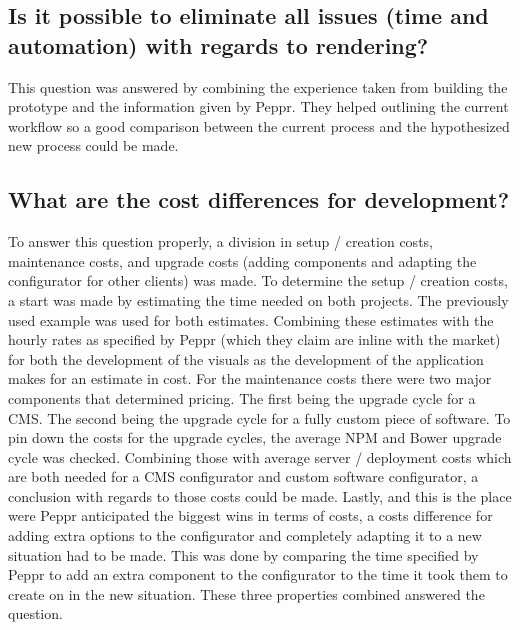 \subsection{Is it possible to eliminate all issues (time and automation) with regards to rendering?}
This question was answered by combining the experience taken from building the prototype and the information given by Peppr. They helped outlining the current workflow so a good comparison between the current process and the hypothesized new process could be made.

\subsection{What are the cost differences for development?}
To answer this question properly, a division in setup / creation costs, maintenance costs, and upgrade costs (adding components and adapting the configurator for other clients) was made. To determine the setup / creation costs, a start was made by estimating the time needed on both projects. The previously used example was used for both estimates. Combining these estimates with the hourly rates as specified by Peppr (which they claim are inline with the market) for both the development of the visuals as the development of the application makes for an estimate in cost.\newline
For the maintenance costs there were two major components that determined pricing. The first being the upgrade cycle for a CMS. The second being the upgrade cycle for a fully custom piece of software. To pin down the costs for the upgrade cycles, the average NPM and Bower upgrade cycle was checked. Combining those with average server / deployment costs which are both needed for a CMS configurator and custom software configurator, a conclusion with regards to those costs could be made.\newline
Lastly, and this is the place were Peppr anticipated the biggest wins in terms of costs, a costs difference for adding extra options to the configurator and completely adapting it to a new situation had to be made. This was done by comparing the time specified by Peppr to add an extra component to the configurator to the time it took them to create on in the new situation. \newline
These three properties combined answered the question.

